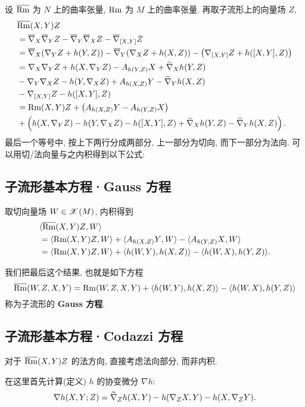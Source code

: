 \documentclass{ctexart}
\begin{document}
设 $\overline{\mathrm{Rm}}$ 为 $N$ 上的曲率张量, $\mathrm{Rm}$ 为 $M$ 上的曲率张量. 再取子流形上的向量场 $Z$,
\begin{align*}
	&\overline{\mathrm{Rm}}(X, Y)Z \\
	&= \overline{\nabla}_{X}{\overline{\nabla}_{Y}{Z}} - \overline{\nabla}_{Y}{\overline{\nabla}_{X}{Z}} - \overline{\nabla}_{[X, Y]}{Z} \\
	&= \overline{\nabla}_{X}{\left(\nabla_{Y}{Z} + h(Y, Z)\right)} - \overline{\nabla}_{Y}{\left(\nabla_{X}{Z} + h(X, Z)\right)} - \left(\nabla_{[X, Y]}{Z} + h([X, Y], Z)\right) \\
	&= \nabla_{X}{\nabla_{Y}{Z}} + h(X, \nabla_{Y}{Z}) - A_{h(Y, Z)}{X} + \widetilde{\nabla}_{X}{h(Y, Z)} \\
	&- \nabla_{Y}{\nabla_{X}{Z}} - h(Y, \nabla_{X}{Z}) + A_{h(X, Z)}{Y} - \widetilde{\nabla}_{Y}{h(X, Z)} \\
	&- \nabla_{[X, Y]}{Z} - h([X, Y], Z) \\
	&= \mathrm{Rm}(X, Y)Z + \left(A_{h(X, Z)}{Y} - A_{h(Y, Z)}{X}\right) \\
	&+ \left(h(X, \nabla_{Y}{Z}) - h(Y, \nabla_{X}{Z}) - h([X, Y], Z) + \widetilde{\nabla}_{X}{h(Y, Z)} - \widetilde{\nabla}_{Y}{h(X, Z)}\right).
\end{align*}
最后一个等号中, 按上下两行分成两部分, 上一部分为切向, 而下一部分为法向. 可以用切/法向量与之内积得到以下公式:

\subsection{子流形基本方程·Gauss 方程}
取切向量场 $W \in \mathscr{X}(M)$, 内积得到
\begin{align*}
	&\langle {\overline{\mathrm{Rm}}(X, Y)Z}, {W} \rangle \\
	&= \langle {\mathrm{Rm}(X, Y)Z}, {W} \rangle + \langle {A_{h(X, Z)}{Y}}, {W} \rangle - \langle {A_{h(Y, Z)}{X}}, {W} \rangle \\
	&= \langle {\mathrm{Rm}(X, Y)Z}, {W} \rangle + \langle {h(W, Y)}, {h(X, Z)} \rangle - \langle {h(W, X)}, {h(Y, Z)} \rangle.
\end{align*}

我们把最后这个结果, 也就是如下方程
\begin{equation}\label{eq::Gauss-equation}
	\overline{\mathrm{Rm}}(W, Z, X, Y) = \mathrm{Rm}(W, Z, X, Y) + \langle {h(W, Y)}, {h(X, Z)} \rangle - \langle {h(W, X)}, {h(Y, Z)} \rangle
\end{equation}
称为子流形的 {\bf Gauss 方程}.

\subsection{子流形基本方程·Codazzi 方程}
对于 $\overline{\mathrm{Rm}}(X, Y)Z$ 的法方向, 直接考虑法向部分, 而非内积.

在这里首先计算(定义) $h$ 的协变微分 $\nabla h$:
$$
	\nabla h(X, Y; Z) = \widetilde{\nabla}_{Z}{h(X, Y)} - h(\nabla_{Z}{X}, Y) - h(X, \nabla_{Z}{Y}).
$$
\end{document}
